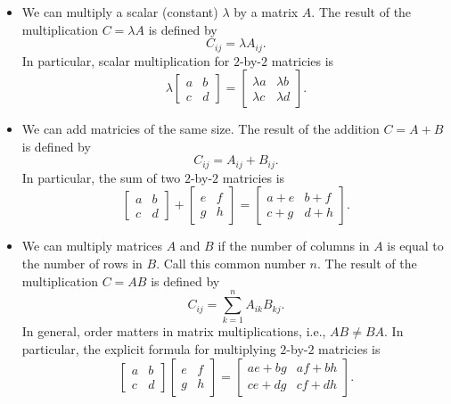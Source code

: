 \documentclass[../main.tex]{subfiles}
\begin{document}
\begin{itemize}
  \item We can multiply a scalar (constant) \(\lambda\) by a matrix \(A\). The result of the multiplication \(C = \lambda A\) is defined by \[C_{ij} = \lambda A_{ij}.\]  In particular, scalar multiplication for \(2\)-by-\(2\) matricies is
\[
  \lambda 
  \begin{bmatrix}
    a & b \\
    c & d
  \end{bmatrix}
  = 
  \begin{bmatrix}
    \lambda a & \lambda b \\
    \lambda c & \lambda d
  \end{bmatrix}.
\]

  \item We can add matricies of the same size. The result of the addition \(C = A + B\) is defined by \[C_{ij} = A_{ij} + B_{ij}.\]  In particular, the sum of two \(2\)-by-\(2\) matricies is
\[
  \begin{bmatrix}
    a & b \\
    c & d
  \end{bmatrix}
  +
  \begin{bmatrix}
    e & f \\
    g & h
  \end{bmatrix}
  =
  \begin{bmatrix}
    a + e & b + f \\
    c + g & d + h
  \end{bmatrix}.
\]

  \item We can multiply matrices \(A\) and \(B\) if the number of columns in \(A\) is equal to the number of rows in \(B\). Call this common number \(n\). The result of the multiplication \(C = AB\) is defined by 
\[
  C_{ij} = \sum_{k=1}^{n} A_{ik} B_{kj}.
\]
In general, order matters in matrix multiplications, i.e., \(AB \ne BA\).  In particular, the explicit formula for multiplying \(2\)-by-\(2\) matricies is
\[
  \begin{bmatrix}
    a & b \\
    c & d
  \end{bmatrix}
  \begin{bmatrix}
    e & f \\
    g & h
  \end{bmatrix}
  =
  \begin{bmatrix}
    ae + bg & af + bh \\
    ce + dg & cf + dh
  \end{bmatrix}.
\]
\end{itemize}
\clearpage
\end{document}
